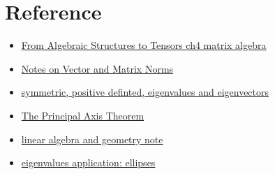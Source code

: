 \section{Reference}
\begin{itemize}
    \item \href{}{From Algebraic Structures to Tensors ch4 matrix algebra}
    \item \href{https://www.cs.utexas.edu/users/flame/Notes/NotesOnNorms.pdf}{Notes on Vector and Matrix Norms}
    \item \href{https://ocw.mit.edu/courses/15-084j-nonlinear-programming-spring-2004/resources/lec4_quad_form/}{symmetric, positive definted, eigenvalues and eigenvectors}
    \item \href{https://www.math.uwaterloo.ca/~jmckinno/Math225/Week7/Lecture2m.pdf}{The Principal Axis Theorem}
    \item \href{https://staff.polito.it/ada.boralevi/didattica/Dispense_ENG.pdf}{linear algebra and geometry note}
    \item \href{http://jde27.uk/la/36_eigenapplications2.html}{eigenvalues application: ellipses}
\end{itemize}
